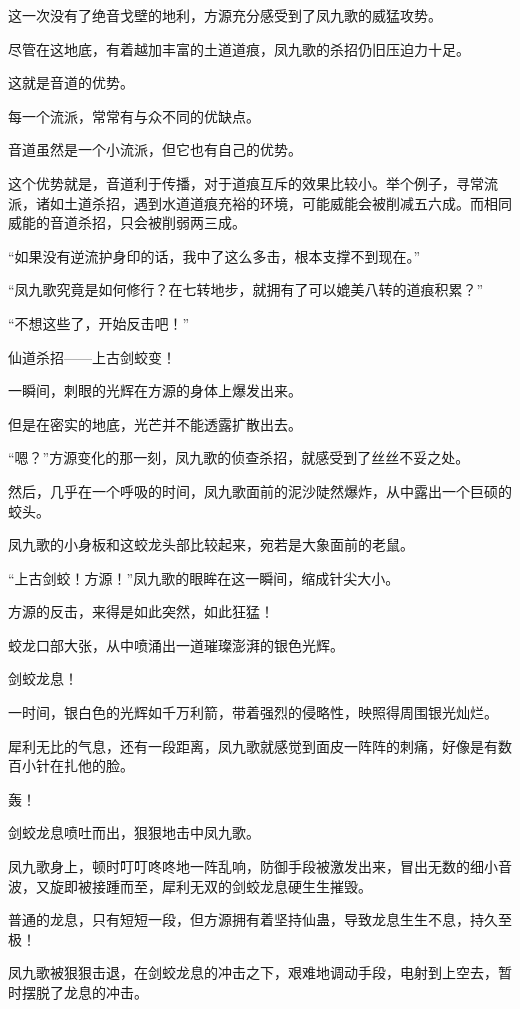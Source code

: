 \begin{this_body}
这一次没有了绝音戈壁的地利，方源充分感受到了凤九歌的威猛攻势。

尽管在这地底，有着越加丰富的土道道痕，凤九歌的杀招仍旧压迫力十足。

这就是音道的优势。

每一个流派，常常有与众不同的优缺点。

音道虽然是一个小流派，但它也有自己的优势。

这个优势就是，音道利于传播，对于道痕互斥的效果比较小。举个例子，寻常流派，诸如土道杀招，遇到水道道痕充裕的环境，可能威能会被削减五六成。而相同威能的音道杀招，只会被削弱两三成。

“如果没有逆流护身印的话，我中了这么多击，根本支撑不到现在。”

“凤九歌究竟是如何修行？在七转地步，就拥有了可以媲美八转的道痕积累？”

“不想这些了，开始反击吧！”

仙道杀招——上古剑蛟变！

一瞬间，刺眼的光辉在方源的身体上爆发出来。

但是在密实的地底，光芒并不能透露扩散出去。

“嗯？”方源变化的那一刻，凤九歌的侦查杀招，就感受到了丝丝不妥之处。

然后，几乎在一个呼吸的时间，凤九歌面前的泥沙陡然爆炸，从中露出一个巨硕的蛟头。

凤九歌的小身板和这蛟龙头部比较起来，宛若是大象面前的老鼠。

“上古剑蛟！方源！”凤九歌的眼眸在这一瞬间，缩成针尖大小。

方源的反击，来得是如此突然，如此狂猛！

蛟龙口部大张，从中喷涌出一道璀璨澎湃的银色光辉。

剑蛟龙息！

一时间，银白色的光辉如千万利箭，带着强烈的侵略性，映照得周围银光灿烂。

犀利无比的气息，还有一段距离，凤九歌就感觉到面皮一阵阵的刺痛，好像是有数百小针在扎他的脸。

轰！

剑蛟龙息喷吐而出，狠狠地击中凤九歌。

凤九歌身上，顿时叮叮咚咚地一阵乱响，防御手段被激发出来，冒出无数的细小音波，又旋即被接踵而至，犀利无双的剑蛟龙息硬生生摧毁。

普通的龙息，只有短短一段，但方源拥有着坚持仙蛊，导致龙息生生不息，持久至极！

凤九歌被狠狠击退，在剑蛟龙息的冲击之下，艰难地调动手段，电射到上空去，暂时摆脱了龙息的冲击。


\end{this_body}
